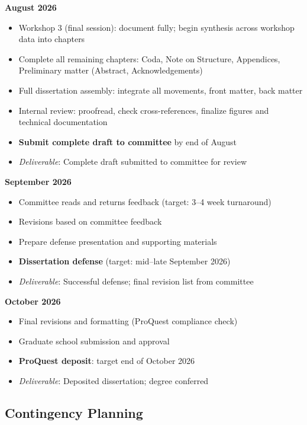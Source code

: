 \textbf{August 2026}
\begin{itemize}[noitemsep]
	\item Workshop 3 (final session): document fully; begin synthesis across workshop data into chapters
	\item Complete all remaining chapters: Coda, Note on Structure, Appendices, Preliminary matter (Abstract, Acknowledgements)
	\item Full dissertation assembly: integrate all movements, front matter, back matter
	\item Internal review: proofread, check cross-references, finalize figures and technical documentation
	\item \textbf{Submit complete draft to committee} by end of August
	\item \textit{Deliverable}: Complete draft submitted to committee for review
\end{itemize}

\textbf{September 2026}
\begin{itemize}[noitemsep]
	\item Committee reads and returns feedback (target: 3–4 week turnaround)
	\item Revisions based on committee feedback
	\item Prepare defense presentation and supporting materials
	\item \textbf{Dissertation defense} (target: mid–late September 2026)
	\item \textit{Deliverable}: Successful defense; final revision list from committee
\end{itemize}

\textbf{October 2026}
\begin{itemize}[noitemsep]
	\item Final revisions and formatting (ProQuest compliance check)
	\item Graduate school submission and approval
	\item \textbf{ProQuest deposit}: target end of October 2026
	\item \textit{Deliverable}: Deposited dissertation; degree conferred
\end{itemize}

\subsection*{Contingency Planning}

